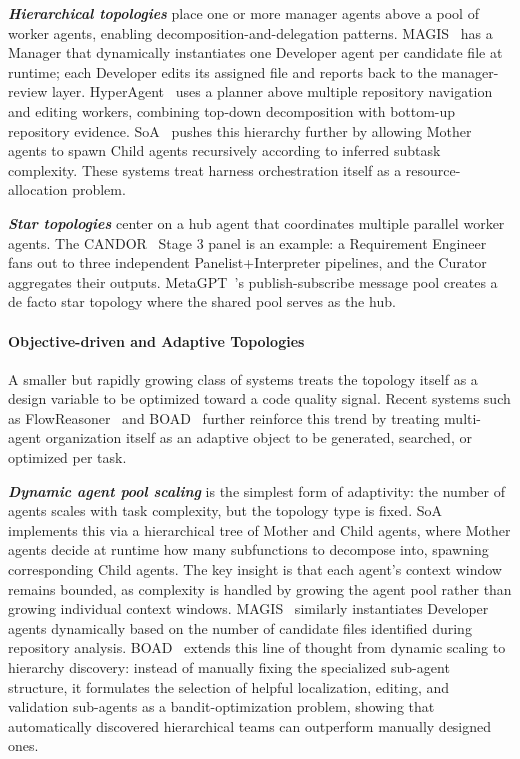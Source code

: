 \documentclass{llmxive}
\begin{document}
\textbf{\textit{Hierarchical topologies}} place one or more
manager agents above a pool of worker agents, enabling
decomposition-and-delegation patterns. MAGIS~\cite{Tao2024Magis}
has a Manager that dynamically instantiates one Developer agent
per candidate file at runtime; each Developer edits its assigned
file and reports back to the manager-review layer. HyperAgent~\cite{Phan2024HyperAgent}
uses a planner above multiple repository navigation and editing
workers, combining top-down decomposition with bottom-up
repository evidence. SoA~\cite{Ishibashi2024SelfOrganized}
pushes this hierarchy further by allowing Mother agents to spawn
Child agents recursively according to inferred subtask
complexity. These systems treat harness orchestration itself as a
resource-allocation problem.

\textbf{\textit{Star topologies}} center on a hub agent that
coordinates multiple parallel worker agents. The
CANDOR~\cite{Xu2025Hallucination} Stage 3 panel is an example: a
Requirement Engineer fans out to three independent
Panelist+Interpreter pipelines, and the Curator aggregates their
outputs. MetaGPT~\cite{Hong2023MetaGPT}'s publish-subscribe
message pool creates a de facto star topology where the shared
pool serves as the hub.

\paragraph{Objective-driven and Adaptive Topologies}
A smaller but rapidly growing class of systems treats the
topology itself as a design variable to be optimized toward a
code quality signal. Recent systems such as
FlowReasoner~\cite{gao2025flowreasoner} and
BOAD~\cite{xu2025boad} further reinforce this trend by treating
multi-agent organization itself as an adaptive object to be
generated, searched, or optimized per task.

\textbf{\textit{Dynamic agent pool scaling}} is the simplest form
of adaptivity: the number of agents scales with task complexity,
but the topology type is fixed.
SoA~\cite{Ishibashi2024SelfOrganized} implements this via a
hierarchical tree of Mother and Child agents, where Mother agents
decide at runtime how many subfunctions to decompose into,
spawning corresponding Child agents. The key insight is that each
agent's context window remains bounded, as complexity is handled
by growing the agent pool rather than growing individual context
windows. MAGIS~\cite{Tao2024Magis} similarly instantiates
Developer agents dynamically based on the number of candidate
files identified during repository analysis. BOAD~\cite{xu2025boad} extends this line of thought from dynamic
scaling to hierarchy discovery: instead of manually fixing the
specialized sub-agent structure, it formulates the selection of
helpful localization, editing, and validation sub-agents as a
bandit-optimization problem, showing that automatically
discovered hierarchical teams can outperform manually designed ones.
\end{document}
